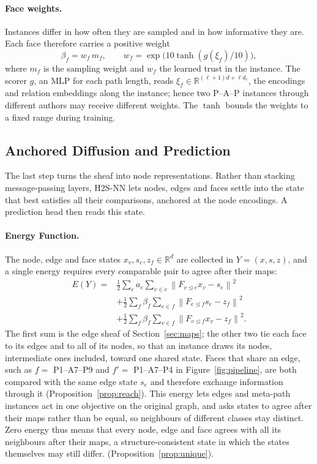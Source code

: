 \documentclass{article}
\newcommand{\R}{\mathbb{R}}
\newcommand{\method}{\textsc{H2S-NN}}
\newcommand{\norm}[1]{\left\lVert #1\right\rVert}
\newcommand{\inc}{\trianglelefteq}
\begin{document}
\paragraph{Face weights.} Instances differ in how often they are sampled and in how informative they are. Each face therefore carries a positive weight
\begin{equation}
  \beta_f=w_f\,m_f,\qquad w_f=\exp\bigl(10\tanh(g(\xi_f)/10)\bigr),
  \label{eq:weight}
\end{equation}
where $m_f$ is the sampling weight and $w_f$ the learned trust in the instance. The scorer $g$, an MLP for each path length, reads $\xi_f\in\R^{(\ell+1)d+\ell d_r}$, the encodings and relation embeddings along the instance; hence two P--A--P instances through different authors may receive different weights. The $\tanh$ bounds the weights to a fixed range during training.


\subsection{Anchored Diffusion and Prediction}
\label{sec:prop}
The last step turns the sheaf into node representations. Rather than stacking message-passing layers, \method{} lets nodes, edges and faces settle into the state that best satisfies all their comparisons, anchored at the node encodings. A prediction head then reads this state.

\paragraph{Energy Function.} The node, edge and face states $x_v,s_e,z_f\in\R^d$ are collected in $Y=(x,s,z)$, and a single energy requires every comparable pair to agree after their maps:
\begin{equation}
\begin{aligned}
  E(Y)={}&\tfrac12\sum_{e}a_e\sum_{v\in e}\norm{F_{v\inc e}x_v-s_e}^2\\
  &+\tfrac12\sum_{f}\beta_f\sum_{e\in f}\norm{F_{e\inc f}s_e-z_f}^2\\
  &+\tfrac12\sum_{f}\beta_f\sum_{v\in f}\norm{F_{v\inc f}x_v-z_f}^2.
\end{aligned}
\label{eq:energy}
\end{equation}
The first sum is the edge sheaf of Section~\ref{sec:maps}; the other two tie each face to its edges and to all of its nodes, so that an instance draws its nodes, intermediate ones included, toward one shared state. Faces that share an edge, such as $f=$ P1--A7--P9 and $f'=$ P1--A7--P4 in Figure~\ref{fig:pipeline}, are both compared with the same edge state $s_e$ and therefore exchange information through it (Proposition~\ref{prop:reach}). This energy lets edges and meta-path instances act in one objective on the original graph, and asks states to agree after their maps rather than be equal, so neighbours of different classes stay distinct. Zero energy thus means that every node, edge and face agrees with all its neighbours after their maps, a structure-consistent state in which the states themselves may still differ.
(Proposition~\ref{prop:unique}).
\end{document}
